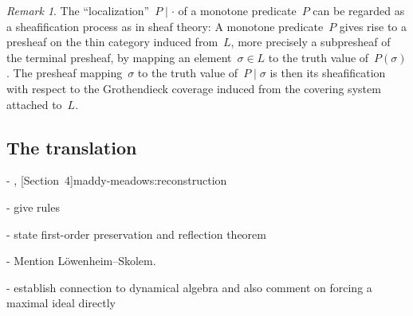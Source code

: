 \documentclass[com,11pt,crcready]{iosart2x}
\theoremstyle{definition}
\theoremstyle{plain}
\theoremstyle{remark}
\newtheorem{remark}[definition]{Remark}
\renewcommand{\_}{\mathpunct{.}\,}
\begin{document}
\begin{remark}The ``localization''~$P \mid \cdot$ of a monotone predicate~$P$
can be regarded as a sheafification process as in sheaf theory: A monotone
predicate~$P$ gives rise to a presheaf on the thin category induced from~$L$,
more precisely a subpresheaf of the terminal presheaf, by mapping an
element~$\sigma \in L$ to the truth value of~$P(\sigma)$. The presheaf
mapping~$\sigma$ to the truth value of~$P \mid \sigma$ is then its
sheafification with respect to the Grothendieck coverage induced from the
covering system attached to~$L$.\end{remark}







\subsection{The translation}

- \cite[Theorem~2]{hamkins:multiverse}, [Section~4]{maddy-meadows:reconstruction}

- give rules

- state first-order preservation and reflection theorem

- Mention
  Löwenheim--Skolem.

- establish connection to dynamical algebra and also comment on
  forcing a maximal ideal directly
\end{document}

